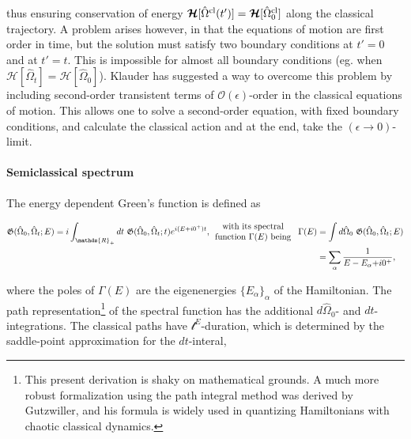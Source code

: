thus ensuring conservation of energy $\bm{\mathcal{H}} [\hat{\Omega}^{\textnormal{cl}} (t')] = \bm{\mathcal{H}} [\hat{\Omega}^{\textnormal{cl}}_0]$ along the classical trajectory. A problem arises however, in that the equations of motion are first order in time, but the solution must satisfy two boundary conditions at $t' = 0$ and at $t' = t$. This is impossible for almost all boundary conditions (eg. when $\bm{\mathcal{H}} [\hat{\Omega}_{t}] = \bm{\mathcal{H}} [\hat{\Omega}_0]$). Klauder has suggested a way to overcome this problem by including second-order transistent terms of $\mathcal{O}(\epsilon)$-order in the classical equations of motion. This allows one to solve a second-order equation, with fixed boundary conditions, and calculate the classical action and at the end, take the $(\epsilon \rightarrow 0)$-limit. \\

\paragraph{Semiclassical spectrum}

The energy dependent Green's function is defined as 

\begin{equation*}\begin{split}
    \mathfrak{G}(\hat{\Omega}_0, \hat{\Omega}_t; E) = i \int_{\mathds{R}_+} dt \blanky \mathfrak{G}(\hat{\Omega}_0, \hat{\Omega}_t; t) e^{i(E+i0^+)t}, \begin{array}{cc}
         \textnormal{with its spectral } \\
         \textnormal{function $\Gamma(E)$ being } 
         \end{array}
        \Gamma(E) &= \int d\hat{\Omega}_0 \blanky \mathfrak{G}(\hat{\Omega}_0, \hat{\Omega}_t; E) \\
        &= \sum_{\alpha} \frac{1}{E-E_{\alpha}{ + i0^+}},
    \end{split}
\end{equation*}

where the poles of $\Gamma(E)$ are the eigenenergies $\{E_{\alpha}\}_{\alpha}$ of the Hamiltonian. The path  representation\footnote{This present derivation is shaky on mathematical grounds. A much more robust formalization using the path integral method was derived by Gutzwiller, and his formula is widely used in quantizing Hamiltonians with chaotic classical dynamics.} of the spectral function has the additional $d\hat{\Omega}_0$- and $dt$-integrations. The classical paths have $\mathcal{t}^E$-duration, which is determined by the saddle-point approximation for the $dt$-interal, 

